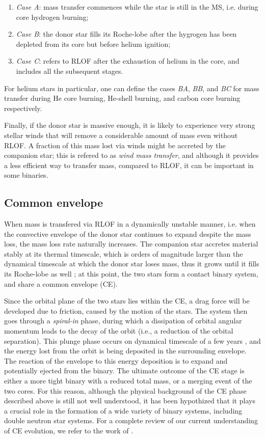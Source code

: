 \documentclass[../../main/thesis_msc.tex]{subfiles}
\begin{document}
				\begin{enumerate}[label=(\roman*)]
					\item \emph{Case A}: mass transfer commences while the star is still in the MS, i.e. during core hydrogen burning;
					\item \emph{Case B}: the donor star fills its Roche-lobe after the hygrogen has been depleted from its core but before helium ignition;
					\item \emph{Case C}: refers to RLOF after the exhaustion of helium in the core, and includes all the subsequent stages.
				\end{enumerate}
				For helium stars in particular, one can define the cases \emph{BA}, \emph{BB}, and \emph{BC} for mass transfer during He core burning, He-shell burning, and carbon core burning respectively.
				
				Finally, if the donor star is massive enough, it is likely to experience very strong stellar winds that will remove a considerable amount of mass even without RLOF. A fraction of this mass lost via winds might be accreted by the companion star; this is refered to as \emph{wind mass transfer}, and although it provides a less efficient way to transfer mass, compared to RLOF, it can be important in some binaries.
				
			\subsection{Common envelope}
			
				When mass is transfered via RLOF in a dynamically unstable manner, i.e. when the convective envelope of the donor star continues to expand despite the mass loss, the mass loss rate naturally increases. The companion star accretes material stably at its thermal timescale, which is orders of magnitude larger than the dynamical timescale at which the donor star loses mass, thus it grows until it fills its Roche-lobe as well \citep{Izzard_CE}; at this point, the two stars form a contact binary system, and share a common envelope (CE).
				
				Since the orbital plane of the two stars lies within the CE, a drag force will be developed due to friction, caused by the motion of the stars. The system then goes through a \emph{spiral-in} phase, during which a dissipation of orbital angular momentum leads to the decay of the orbit (i.e., a reduction of the orbital separation). This plunge phase occurs on dynamical timescale of a few years \citep{Izzard_CE}, and the energy lost from the orbit is being deposited in the surrounding envelope. The reaction of the envelope to this energy deposition is to expand and potentially ejected from the binary. The ultimate outcome of the CE stage is either a more tight binary with a reduced total mass, or a merging event of the two cores. For this reason, although the physical background of the CE phase described above is still not well understood, it has been hypothized that it plays a crucial role in the formation of a wide variety of binary systems, including double neutron star systems. For a complete review of our current understanding of CE evolution, we refer to the work of \cite{Ivanova_CE}.
				
\end{document}
